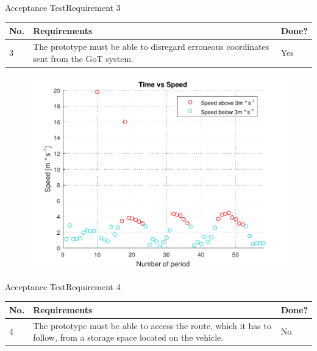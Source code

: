 \begin{frame}{Acceptance Test}{Requirement 3}

\begin{table}[H] \centering
\begin{tabular}{|p{0.5cm}| p{7cm} |p{1cm}|}
\hline
\textbf{No.}  &  \textbf{Requirements} & \textbf{Done?}     \\ 
\hline
3 & The prototype must be able to disregard erroneous coordinates sent from the GoT system. & Yes \\ \hline
\end{tabular}
\end{table}

  \pause

\begin{figure}[H]
  \centering
  \includegraphics[scale=0.4]{Pictures/plot3.pdf}
\end{figure}

\end{frame}



\begin{frame}{Acceptance Test}{Requirement 4}

\begin{table}[H] \centering
\begin{tabular}{|p{0.5cm}| p{7cm} |p{1cm}|}
\hline
\textbf{No.}  &  \textbf{Requirements} & \textbf{Done?}     \\ 
\hline
4 & The prototype must be able to access the route, which it has to follow, from a storage space located on the vehicle. & No \\ 
\hline
\end{tabular}
\end{table}
\end{frame}

